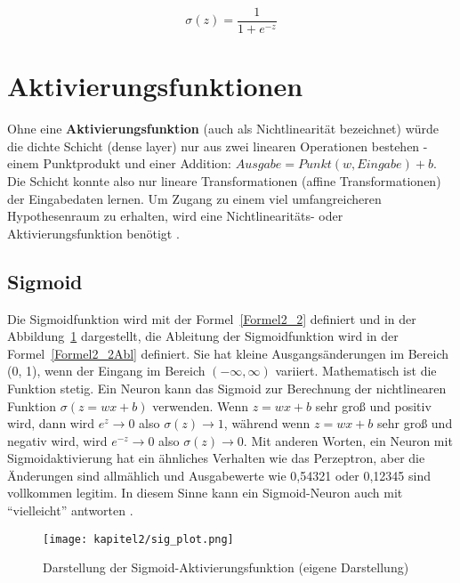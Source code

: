 \begin{equation} \label{Formel2_2}
    \sigma (z) = \frac{1}{1+e^{-z}}
\end{equation}


\section{Aktivierungsfunktionen}
Ohne eine \textbf{Aktivierungsfunktion} (auch als Nichtlinearität bezeichnet) würde die dichte Schicht (dense layer) nur aus zwei linearen Operationen bestehen - einem Punktprodukt und einer Addition: $Ausgabe = Punkt (w, Eingabe) + b$. Die Schicht konnte also nur lineare Transformationen (affine Transformationen) der Eingabedaten lernen. Um Zugang zu einem viel umfangreicheren Hypothesenraum zu erhalten, wird eine Nichtlinearitäts- oder Aktivierungsfunktion benötigt \cite*[S. 72]{Chollet2017}.

\subsection{Sigmoid}
Die Sigmoidfunktion wird mit der Formel~\ref{Formel2_2} definiert und in der Abbildung~\ref{Kap2:Sigmoid_plot} dargestellt, die Ableitung der Sigmoidfunktion wird in der Formel~\ref{Formel2_2Abl} definiert. Sie hat kleine Ausgangsänderungen im Bereich (0, 1), wenn der Eingang im Bereich $(-\infty, \infty)$ variiert. Mathematisch ist die Funktion stetig. Ein Neuron kann das Sigmoid zur Berechnung der nichtlinearen Funktion $\sigma(z = wx + b)$ verwenden. Wenn $z = wx + b$ sehr groß und positiv wird, dann wird $e^z \rightarrow 0$ also $\sigma(z) \rightarrow 1$, während wenn $z = wx + b$ sehr groß und negativ wird, wird $e^{-z} \rightarrow 0$ also $\sigma(z) \rightarrow 0$. Mit anderen Worten, ein Neuron mit Sigmoidaktivierung hat ein ähnliches Verhalten wie das Perzeptron, aber die Änderungen sind allmählich und Ausgabewerte wie 0,54321 oder 0,12345 sind vollkommen legitim. In diesem Sinne kann ein Sigmoid-Neuron auch mit \enquote{vielleicht} antworten \cite*[10]{AntonioGuili;AmitaKapoor;SujitPal2019}.

\begin{figure}[H]
    \centering
    \texttt{[image: kapitel2/sig\_plot.png]}
    \caption[Darstellung der Sigmoid-Aktivierungsfunktion]{Darstellung der Sigmoid-Aktivierungsfunktion (eigene Darstellung)}
    \label{Kap2:Sigmoid_plot}
\end{figure}


